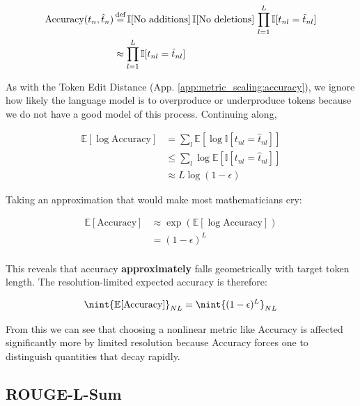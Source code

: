 \begin{align}
    \text{Accuracy}(t_n, \hat{t}_n) &\operatorname{\stackrel{\text{def}}{=}} \mathbb{I}[\text{No additions}] \, \mathbb{I}[\text{No deletions}] \, \prod_{l=1}^L \mathbb{I}[t_{nl} = \hat{t}_{nl}]\\
    &\approx \prod_{l=1}^L \mathbb{I}[t_{nl} = \hat{t}_{nl}]
\end{align}

As with the Token Edit Distance (App. \ref{app:metric_scaling:accuracy}), we ignore how likely the language model is to overproduce or underproduce tokens because we do not have a good model of this process. Continuing along,

\begin{align}
    \mathbb{E}[\log \text{Accuracy}] &= \sum_l \mathbb{E}[\log \mathbb{I}[t_{nl} = \hat{t}_{nl}]]\\
    &\leq \sum_l \log \mathbb{E}[\mathbb{I}[t_{nl} = \hat{t}_{nl}]]\\
    &\approx L \log (1- \epsilon)
\end{align}

Taking an approximation that would make most mathematicians cry:

\begin{align}
    \mathbb{E}[\text{Accuracy}] &\approx \exp(\mathbb{E}[\log \text{Accuracy}])\\
    &= (1 - \epsilon)^L\\
\end{align}

This reveals that accuracy \textbf{approximately} falls geometrically with target token length. The resolution-limited expected accuracy is therefore:

\begin{equation}
    \nint{\mathbb{E}[\text{Accuracy}]}_{NL} = \nint{(1 - \epsilon)^L}_{NL}
\end{equation}

From this we can see that choosing a nonlinear metric like Accuracy is affected significantly more by limited resolution because Accuracy forces one to distinguish quantities that decay rapidly.

\subsection{ROUGE-L-Sum}
\label{app:metric_scaling:rougeLsum}

